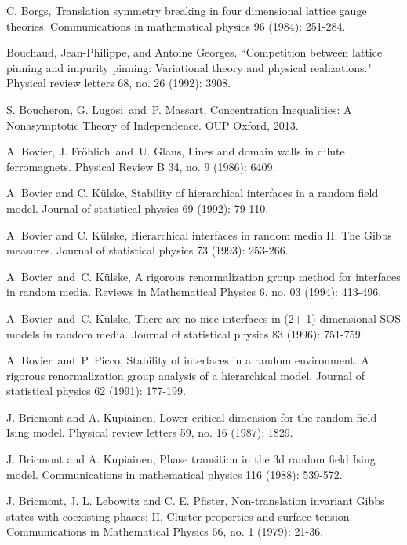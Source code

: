 \documentclass[11pt, reqno]{amsart}
\numberwithin{equation}{section}
\begin{document}
\begin{thebibliography}{}
C. Borgs, Translation symmetry breaking in four dimensional lattice gauge theories. Communications in mathematical physics 96 (1984): 251-284.

Bouchaud, Jean-Philippe, and Antoine Georges. ``Competition between lattice pinning and impurity pinning: Variational theory and physical realizations." Physical review letters 68, no. 26 (1992): 3908.

S. Boucheron, G. Lugosi\ and\ P. Massart, Concentration Inequalities: A Nonasymptotic Theory of Independence. OUP Oxford, 2013.

A. Bovier, J. Fr\"ohlich\ and\ U. Glaus, Lines and domain walls in dilute ferromagnets. Physical Review B 34, no. 9 (1986): 6409.

A. Bovier and C. K\"ulske, Stability of hierarchical interfaces in a random field model. Journal of statistical physics 69 (1992): 79-110.

A. Bovier and C. K\"ulske, Hierarchical interfaces in random media II: The Gibbs measures. Journal of statistical physics 73 (1993): 253-266.

A. Bovier\ and\ C. Külske, A rigorous renormalization group method for interfaces in random media. Reviews in Mathematical Physics 6, no. 03 (1994): 413-496.

A. Bovier\ and\ C. K\"ulske, There are no nice interfaces in (2+ 1)-dimensional SOS models in random media. Journal of statistical physics 83 (1996): 751-759.

A. Bovier\ and\ P. Picco, Stability of interfaces in a random environment. A rigorous renormalization group analysis of a hierarchical model. Journal of statistical physics 62 (1991): 177-199.

J. Bricmont and A. Kupiainen, Lower critical dimension for the random-field Ising model. Physical review letters 59, no. 16 (1987): 1829.

J. Bricmont and A. Kupiainen, Phase transition in the 3d random field Ising model. Communications in mathematical physics 116 (1988): 539-572.

J. Bricmont, J. L. Lebowitz and C. E. Pfister, Non-translation invariant Gibbs states with coexisting phases: II. Cluster properties and surface tension. Communications in Mathematical Physics 66, no. 1 (1979): 21-36.


\end{thebibliography}
\end{document}
